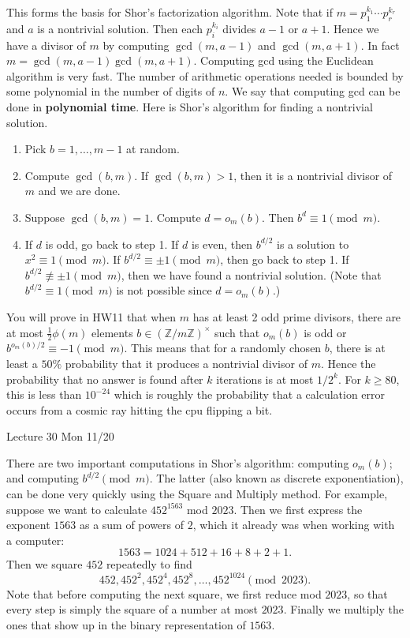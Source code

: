 \documentclass{article}
\def\Z{{\mathbb Z}}
\def\Z{{\mathbb Z}}
\newcommand{\add}[1]{{\color{blue} #1}}
\begin{document}
This forms the basis for Shor's factorization algorithm. Note that if $m = p_1^{k_1}\cdots p_r^{k_r}$ and $a$ is a nontrivial solution. Then each $p_i^{k_i}$ divides $a-1$ or $a+1$. Hence we have a divisor of $m$ by computing $\gcd(m, a-1)$ and $\gcd(m, a+1)$. In fact $m = \gcd(m, a-1)\gcd(m, a+1)$. Computing gcd using the Euclidean algorithm is very fast. The number of arithmetic operations needed is bounded by some polynomial in the number of digits of $n$. We say that computing gcd can be done in \textbf{polynomial time}. Here is Shor's algorithm for finding a nontrivial solution.
\begin{enumerate}
    \item Pick $b = 1,\ldots,m-1$ at random.
    \item Compute $\gcd(b,m)$. If $\gcd(b,m) > 1$, then it is a nontrivial divisor of $m$ and we are done.
    \item Suppose $\gcd(b,m) = 1$. Compute $d = o_m(b)$. Then $b^d\equiv 1\pmod{m}$.
    \item If $d$ is odd, go back to step 1. If $d$ is even, then $b^{d/2}$ is a solution to $x^2\equiv 1\pmod{m}$. If $b^{d/2}\equiv \pm 1\pmod{m}$, then go back to step 1. If $b^{d/2}\not\equiv \pm 1\pmod{m}$, then we have found a nontrivial solution. (Note that $b^{d/2}\equiv  1\pmod{m}$ is not possible since $d = o_m(b)$.)
\end{enumerate}
You will prove in HW11 that when $m$ has at least 2 odd prime divisors, there are at most $\frac12\phi(m)$ elements $b\in(\Z/m\Z)^\times$ such that $o_m(b)$ is odd or $b^{o_m(b)/2}\equiv -1\pmod{m}$. This means that for a randomly chosen $b$, there is at least a $50\%$ probability that it produces a nontrivial divisor of $m$. Hence the probability that no answer is found after $k$ iterations is at most $1/2^k$. For $k\geq 80$, this is less than $10^{-24}$ which is roughly the probability that a calculation error occurs from a cosmic ray hitting the cpu flipping a bit. 

\begin{center}
    \add{Lecture 30 Mon 11/20}
\end{center}

There are two important computations in Shor's algorithm: computing $o_m(b)$; and computing $b^{d/2}\pmod{m}$. The latter (also known as discrete exponentiation), can be done very quickly using the Square and Multiply method. For example, suppose we want to calculate $452^{1563}$ mod $2023$. Then we first express the exponent $1563$ as a sum of powers of $2$, which it already was when working with a computer:
    $$1563 = 1024 + 512 + 16 + 8 + 2 + 1.$$
    Then we square $452$ repeatedly to find
    $$452, 452^2, 452^4, 452^8,\ldots, 452^{1024}\pmod{2023}.$$
    Note that before computing the next square, we first reduce mod $2023$, so that every step is simply the square of a number at most $2023$. Finally we multiply the ones that show up in the binary representation of $1563$.
\end{document}
